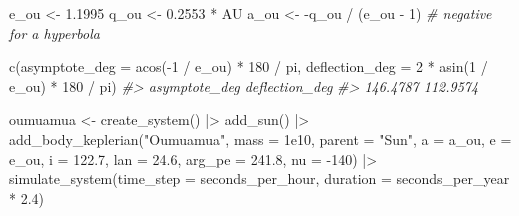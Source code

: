 \documentclass[
  10.5pt,
  letterpaper,
]{scrbook}
\newenvironment{Shaded}{\begin{snugshade}}{\end{snugshade}}
\newcommand{\AttributeTok}[1]{\textcolor[rgb]{0.00,0.00,0.00}{#1}}
\newcommand{\CommentTok}[1]{\textcolor[rgb]{0.00,0.00,0.00}{\textit{#1}}}
\newcommand{\DecValTok}[1]{\textcolor[rgb]{0.00,0.00,0.00}{#1}}
\newcommand{\FloatTok}[1]{\textcolor[rgb]{0.00,0.00,0.00}{#1}}
\newcommand{\FunctionTok}[1]{\textcolor[rgb]{0.00,0.00,0.00}{#1}}
\newcommand{\NormalTok}[1]{\textcolor[rgb]{0.00,0.00,0.00}{#1}}
\newcommand{\OtherTok}[1]{\textcolor[rgb]{0.00,0.00,0.00}{#1}}
\newcommand{\SpecialCharTok}[1]{\textcolor[rgb]{0.00,0.00,0.00}{#1}}
\newcommand{\StringTok}[1]{\textcolor[rgb]{0.00,0.00,0.00}{#1}}
\theoremstyle{plain}
\theoremstyle{remark}
\begin{document}
\begin{Shaded}
\begin{Highlighting}[]
\NormalTok{e\_ou }\OtherTok{\textless{}{-}} \FloatTok{1.1995}
\NormalTok{q\_ou }\OtherTok{\textless{}{-}} \FloatTok{0.2553} \SpecialCharTok{*}\NormalTok{ AU}
\NormalTok{a\_ou }\OtherTok{\textless{}{-}} \SpecialCharTok{{-}}\NormalTok{q\_ou }\SpecialCharTok{/}\NormalTok{ (e\_ou }\SpecialCharTok{{-}} \DecValTok{1}\NormalTok{)                   }\CommentTok{\# negative for a hyperbola}

\FunctionTok{c}\NormalTok{(}\AttributeTok{asymptote\_deg =} \FunctionTok{acos}\NormalTok{(}\SpecialCharTok{{-}}\DecValTok{1} \SpecialCharTok{/}\NormalTok{ e\_ou) }\SpecialCharTok{*} \DecValTok{180} \SpecialCharTok{/}\NormalTok{ pi,}
  \AttributeTok{deflection\_deg =} \DecValTok{2} \SpecialCharTok{*} \FunctionTok{asin}\NormalTok{(}\DecValTok{1} \SpecialCharTok{/}\NormalTok{ e\_ou) }\SpecialCharTok{*} \DecValTok{180} \SpecialCharTok{/}\NormalTok{ pi)}
\CommentTok{\#\textgreater{}  asymptote\_deg deflection\_deg }
\CommentTok{\#\textgreater{}       146.4787       112.9574}

\NormalTok{oumuamua }\OtherTok{\textless{}{-}} \FunctionTok{create\_system}\NormalTok{() }\SpecialCharTok{|\textgreater{}}
  \FunctionTok{add\_sun}\NormalTok{() }\SpecialCharTok{|\textgreater{}}
  \FunctionTok{add\_body\_keplerian}\NormalTok{(}\StringTok{"Oumuamua"}\NormalTok{, }\AttributeTok{mass =} \FloatTok{1e10}\NormalTok{, }\AttributeTok{parent =} \StringTok{"Sun"}\NormalTok{,}
                     \AttributeTok{a =}\NormalTok{ a\_ou, }\AttributeTok{e =}\NormalTok{ e\_ou, }\AttributeTok{i =} \FloatTok{122.7}\NormalTok{, }\AttributeTok{lan =} \FloatTok{24.6}\NormalTok{,}
                     \AttributeTok{arg\_pe =} \FloatTok{241.8}\NormalTok{, }\AttributeTok{nu =} \SpecialCharTok{{-}}\DecValTok{140}\NormalTok{) }\SpecialCharTok{|\textgreater{}}
  \FunctionTok{simulate\_system}\NormalTok{(}\AttributeTok{time\_step =}\NormalTok{ seconds\_per\_hour, }\AttributeTok{duration =}\NormalTok{ seconds\_per\_year }\SpecialCharTok{*} \FloatTok{2.4}\NormalTok{)}
\end{Highlighting}
\end{Shaded}
\end{document}
